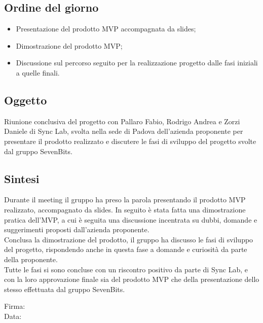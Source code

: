 \documentclass[10pt]{article}
\begin{document}
\subsection{Ordine del giorno}
\begin{itemize}
    \item Presentazione del prodotto MVP accompagnata da slides;
    \item Dimostrazione del prodotto MVP;
    \item Discussione sul percorso seguito per la realizzazione progetto dalle fasi iniziali a quelle finali.
\end{itemize}

\subsection{Oggetto}
Riunione conclusiva del progetto con Pallaro Fabio, Rodrigo Andrea e Zorzi Daniele di Sync Lab, svolta nella sede di Padova dell'azienda proponente
per presentare il prodotto realizzato e discutere le fasi di sviluppo del progetto svolte dal gruppo SevenBits.

\subsection{Sintesi}
Durante il meeting il gruppo ha preso la parola presentando il prodotto MVP realizzato, accompagnato da slides. In seguito è stata fatta una dimostrazione pratica
dell'MVP, a cui è seguita una discussione incentrata su dubbi, domande e suggerimenti proposti dall'azienda proponente.\\
Conclusa la dimostrazione del prodotto, il gruppo ha discusso le fasi di sviluppo del progetto, rispondendo anche in questa fase a domande e curiosità da parte 
della proponente.\\
Tutte le fasi si sono concluse con un riscontro positivo da parte di Sync Lab, e con la loro approvazione finale sia del prodotto MVP che della presentazione dello stesso
effettuata dal gruppo SevenBits.\\


\vfill
\begin{minipage}{10cm}
Firma: \hrulefill \\
\vspace{2mm}
Data: \dotfill
\end{minipage}
\end{document}
